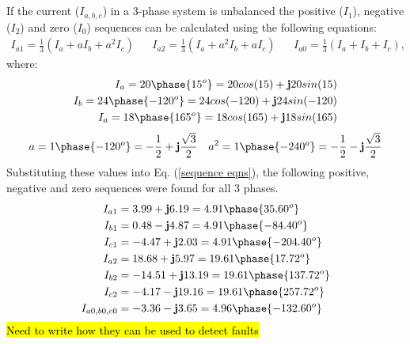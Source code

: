     \subsection{}
        If the current (\(I_{a, b, c}\)) in a 3-phase system is unbalanced the positive (\(I_1\)), negative (\(I_2\)) and zero (\(I_0\)) sequences can be calculated using the following equations:
        \begin{align}
            I_{a1} = \frac{1}{3}\left(I_a + aI_b + a^2I_c\right) && I_{a2} = \frac{1}{3}\left(I_a + a^2I_b + aI_c\right) && I_{a0} = \frac{1}{3}\left(I_a + I_b + I_c\right), \label{sequence eqns}
        \end{align}
        where:
        \begin{align}
            I_a = 20\phase{15^o} = 20cos(15) + \textbf{j}20sin(15) \\
            I_b = 24\phase{-120^o} = 24cos(-120) + \textbf{j}24sin(-120) \\
            I_a = 18\phase{165^o} = 18cos(165) + \textbf{j}18sin(165)
        \end{align}
        \begin{align}
            a = 1\phase{-120^o} = -\frac{1}{2} + \textbf{j}\frac{\sqrt{3}}{2} && a^2 = 1\phase{-240^o} = -\frac{1}{2} - \textbf{j}\frac{\sqrt{3}}{2}
        \end{align}
        Substituting these values into Eq. (\ref{sequence eqns}), the following positive, negative and zero sequences were found for all 3 phases.
        \begin{align}
            I_{a1} &= 3.99 + \textbf{j}6.19 = 4.91\phase{35.60^o} \\ I_{b1} &= 0.48 - \textbf{j}4.87 = 4.91\phase{-84.40^o} \\
            I_{c1} &= -4.47 + \textbf{j}2.03 = 4.91\phase{-204.40^o} \\
            I_{a2} &= 18.68 + \textbf{j}5.97 = 19.61\phase{17.72^o} \\ I_{b2} &= -14.51 + \textbf{j}13.19 = 19.61\phase{137.72^o} \\
            I_{c2} &= -4.17 - \textbf{j}19.16 = 19.61\phase{257.72^o} \\
            I_{a0, b0, c0} &= -3.36 - \textbf{j}3.65 = 4.96\phase{-132.60^o}
        \end{align}
        \hl{Need to write how they can be used to detect faults}